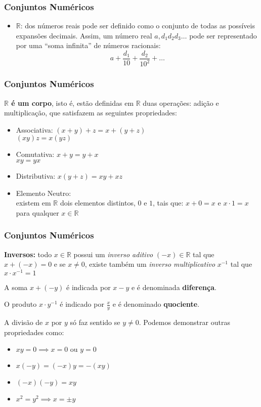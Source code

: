 \documentclass[hyperref={pdfpagelabels=false}]{beamer}
\begin{document}
\begin{frame}
\frametitle{Conjuntos Numéricos}

\begin{itemize}
 \item $\mathbb{R}$: \pause dos números reais pode ser definido como o conjunto de todas as possíveis expansões decimais. Assim, um número real $a,d_{1}d_{2}d_{3}\dots$ pode ser representado por uma ``soma infinita'' de números racionais: $$a + \frac{d_1}{10} + \frac{d_2}{10^2} + \dots $$
\end{itemize}

\end{frame}


\begin{frame}
\frametitle{Conjuntos Numéricos}
\textbf{$\mathbb{R}$ é um corpo}, isto é, estão definidas em $\mathbb{R}$ duas operações: adição e multiplicação, que satisfazem as seguintes propriedades:
\begin{multicols}{2}
\begin{itemize}
	\item Associativa: $(x+y)+z = x+(y+z)$ \\ $(xy)z=x(yz)$ \pause
	\item Comutativa: $x+y=y+x$ \\ $xy=yx$ \\ \pause
	\item Distributiva: $x(y+z) = xy + xz$ \pause
	\item Elemento Neutro: \\ existem em $\mathbb{R}$ dois elementos distintos, $0$ e $1$, tais que: $x+0=x$ e $x \cdot 1= x$ para qualquer $x \in \mathbb{R}$
\end{itemize}
\end{multicols}

\end{frame}


\begin{frame}
\frametitle{Conjuntos Numéricos}
{\bf Inversos:} todo $x \in \mathbb{R}$ possui um {\it inverso aditivo} $(-x) \in \mathbb{R}$ tal que $x + (-x) = 0$ e se $x \neq 0$, existe também um {\it inverso multiplicativo} $x^{-1}$ tal que $x \cdot x^{-1} = 1$ \pause

A soma $x + (-y)$ é indicada por $x-y$ e é denominada {\bf diferença}. \pause

O produto $x \cdot y^{-1} $ é indicado por $\frac{x}{y}$ e é denominado {\bf quociente}. \pause

A divisão de $x$ por $y$ só faz sentido se $y \neq 0$. Podemos demonstrar outras propriedades como:

\begin{itemize}
	\item $xy=0 \implies x =0 \text{ ou } y=0$ \pause
	\item $x(-y)=(-x)y = -(xy)$ \pause
	\item $(-x)(-y)=xy$ \pause
	\item $x^2=y^2 \implies x = \pm y$ \pause
\end{itemize}

\end{frame}
\end{document}
